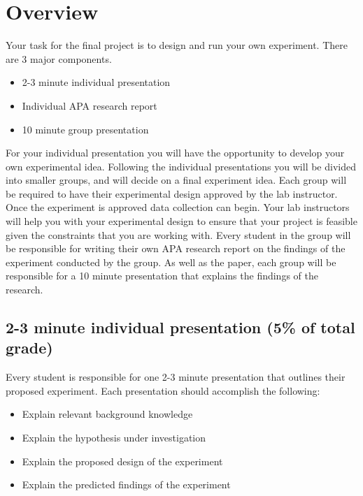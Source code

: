 
\section{Overview}

Your task for the final project is to design and run your own experiment. There are 3 major components.

\begin{itemize}
\item 2-3 minute individual presentation
\item Individual APA research report
\item 10 minute group presentation
\end{itemize}

For your individual presentation you will have the opportunity to develop your own experimental idea. Following the individual presentations you will be divided into smaller groups, and will decide on a final experiment idea. Each group will be required to have their experimental design approved by the lab instructor. Once the experiment is approved data collection can begin. Your lab instructors will help you with your experimental design to ensure that your project is feasible given the constraints that you are working with. Every student in the group will be responsible for writing their own APA research report on the findings of the experiment conducted by the group. As well as the paper, each group will be responsible for a 10 minute presentation that explains the findings of the research.

\subsection{2-3 minute individual presentation (5\% of total grade)}

Every student is responsible for one 2-3 minute presentation that outlines their proposed experiment. Each presentation should accomplish the following:

\begin{itemize}
\item Explain relevant background knowledge
\item Explain the hypothesis under investigation
\item Explain the proposed design of the experiment
\item Explain the predicted findings of the experiment
\end{itemize}

